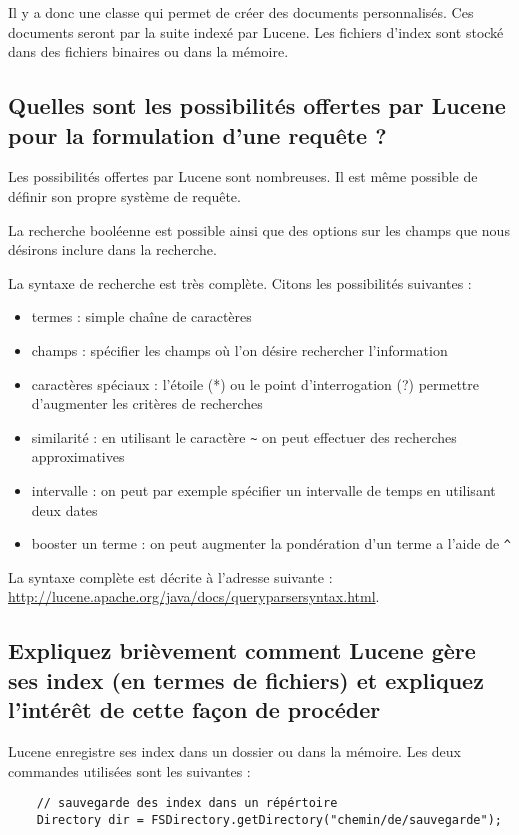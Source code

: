 \documentclass[a4paper, 11pt]{article}
\begin{document}
{Il y a donc une classe qui permet de créer des documents personnalisés. Ces documents seront par la suite indexé par Lucene. Les fichiers d'index sont stocké dans des fichiers binaires ou dans la mémoire. 

\subsection{Quelles sont les possibilités offertes par Lucene pour la formulation d’une requête ?}
Les possibilités offertes par Lucene sont nombreuses. Il est même possible de définir son propre système de requête. 

La recherche booléenne est possible ainsi que des options sur les champs que nous désirons inclure dans la recherche. 

La syntaxe de recherche est très complète. Citons les possibilités suivantes : 

\begin{itemize}
	\item termes : simple chaîne de caractères
	\item champs : spécifier les champs où l'on désire rechercher l'information
	\item caractères spéciaux : l'étoile (*) ou le point d'interrogation (?) permettre d'augmenter les critères de recherches
	\item similarité : en utilisant le caractère \verb$~$ on peut effectuer des recherches approximatives
	\item intervalle : on peut par exemple spécifier un intervalle de temps en utilisant deux dates
	\item booster un terme : on peut augmenter la pondération d'un terme a l'aide de \verb$^$
\end{itemize}

La syntaxe complète est décrite à l'adresse suivante : \url{http://lucene.apache.org/java/docs/queryparsersyntax.html}.

 
\subsection{Expliquez brièvement comment Lucene gère ses index (en termes de fichiers) et expliquez l’intérêt de cette façon de procéder}

Lucene enregistre ses index dans un dossier ou dans la mémoire. Les deux commandes utilisées sont les suivantes : 

\begin{verbatim}
	// sauvegarde des index dans un répértoire
	Directory dir = FSDirectory.getDirectory("chemin/de/sauvegarde"); 
	

\end{verbatim}}
\end{document}
